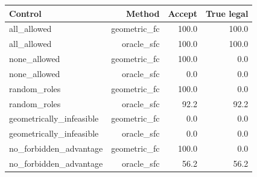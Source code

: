 \begin{tabular}{lrrr}
\toprule
Control & Method & Accept & True legal \\
\midrule
all\_allowed & geometric\_fc & 100.0 & 100.0 \\
all\_allowed & oracle\_sfc & 100.0 & 100.0 \\
none\_allowed & geometric\_fc & 100.0 & 0.0 \\
none\_allowed & oracle\_sfc & 0.0 & 0.0 \\
random\_roles & geometric\_fc & 100.0 & 0.0 \\
random\_roles & oracle\_sfc & 92.2 & 92.2 \\
geometrically\_infeasible & geometric\_fc & 0.0 & 0.0 \\
geometrically\_infeasible & oracle\_sfc & 0.0 & 0.0 \\
no\_forbidden\_advantage & geometric\_fc & 100.0 & 0.0 \\
no\_forbidden\_advantage & oracle\_sfc & 56.2 & 56.2 \\
\bottomrule
\end{tabular}
